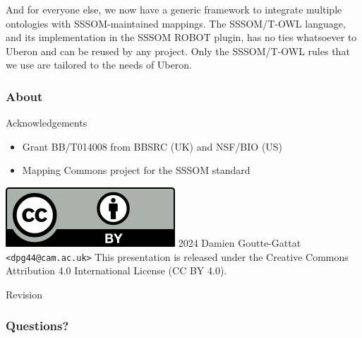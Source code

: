 \begin{frame}
{  And for everyone else, we now have a generic framework to integrate multiple
  ontologies with SSSOM-maintained mappings. The SSSOM/T-OWL language, and its
  implementation in the SSSOM ROBOT plugin, has no ties whatsoever to Uberon
  and can be reused by any project. Only the SSSOM/T-OWL rules that we use are
  tailored to the needs of Uberon.}

\end{frame}

\begin{frame}
  \frametitle{About}

  \begin{block}{Acknowledgements}
    \begin{itemize}
      \item Grant BB/T014008 from BBSRC (UK) and NSF/BIO (US)
      \item Mapping Commons project for the SSSOM standard
    \end{itemize}
  \end{block}

  \begin{block}{\includegraphics[scale=.26]{ccby}\hspace{.2em}%
    2024 Damien Goutte-Gattat \texttt{<dpg44@cam.ac.uk>}}
    This presentation is released under the Creative Commons Attribution
    4.0 International License (CC BY 4.0).
  \end{block}

  \begin{block}{Revision}\ttfamily\scriptsize
    
  \end{block}
\end{frame}

\appendix
\begin{frame}[noframenumbering]
  \frametitle{Questions?}
\end{frame}

